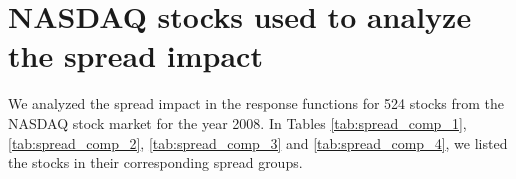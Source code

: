 \section{NASDAQ stocks used to analyze the spread impact}
\label{app:spread_impact}

We analyzed the spread impact in the response functions for 524 stocks from the
NASDAQ stock market for the year 2008. In Tables \ref{tab:spread_comp_1},
\ref{tab:spread_comp_2}, \ref{tab:spread_comp_3} and \ref{tab:spread_comp_4},
we listed the stocks in their corresponding spread groups.

